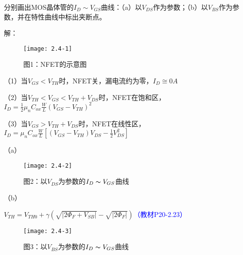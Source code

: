 




分别画出MOS晶体管的$I_{D} \sim V_{GS}$曲线：（a）以$V_{DS}$作为参数；（b）以$V_{BS}$作为参数，并在特性曲线中标出夹断点。

解：

	\begin{figure}[H] %
	\centering %
	\begin{minipage}{\linewidth}
		\texttt{[image: 2.4-1]}
	\end{minipage}
	\caption*{图1：NFET的示意图} %
\end{figure}

（1）当$V_{GS}<V_{TH}$时，NFET关，漏电流约为零，$I_D\cong0A$

（2）当$V_{TH}<V_{GS}<V_{TH}+V_{DS}$时，NFET在饱和区，$I_D=\frac{1}{2}\mu_nC_{ox}\frac{W}{L}(V_{GS}-V_{TH})^2$

（3）当$V_{GS}>V_{TH}+V_{DS}$时，NFET在线性区，$I_D=\mu_nC_{ox}\frac{W}{L}[(V_{GS}-V_{TH})V_{DS}-\frac{1}{2}V_{DS}^2]$

（a）

	\begin{figure}[H] %
	\centering %
	\begin{minipage}{\linewidth}
		\texttt{[image: 2.4-2]}
	\end{minipage}
	\caption*{图2：以$V_{DS}$为参数的$I_D \thicksim V_{GS}$曲线} %
\end{figure}

（b）

$V_{TH}=V_{TH0}+\gamma(\sqrt{|2\Phi_F+V_{SB}|}-\sqrt{|2\Phi_F|})$\textcolor{blue}{（教材P20-2.23）}

\begin{figure}[H] %
	\centering %
	\begin{minipage}{\linewidth}
		\texttt{[image: 2.4-3]}
	\end{minipage}
	\caption*{图3：以$V_{BS}$为参数的$I_D \thicksim V_{GS}$曲线} %
\end{figure}
